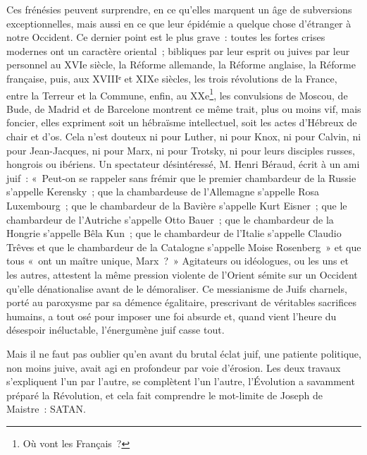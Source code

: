 \documentclass[french,twoside]{book} %
\begin{document}
Ces frénésies peuvent surprendre, en ce qu’elles marquent un âge de subversions exceptionnelles, mais aussi en ce que leur épidémie a quelque chose d’étranger à notre Occident. Ce dernier point est le plus grave : toutes les fortes crises modernes ont un caractère oriental ; bibliques par leur esprit ou juives par leur personnel au XVIe siècle, la Réforme allemande, la Réforme anglaise, la Réforme française, puis, aux XVIIIᵉ et XIXe siècles, les trois révolutions de la France, entre la Terreur et la Commune, enfin, au XXe\footnote{Où vont les Français ?}, les convulsions de Moscou, de Bude, de Madrid et de Barcelone montrent ce même trait, plus ou moins vif, mais foncier, elles expriment soit un hébraïsme intellectuel, soit les actes d’Hébreux de chair et d’os. Cela n’est douteux ni pour Luther, ni pour Knox, ni pour Calvin, ni pour Jean-Jacques, ni pour Marx, ni pour Trotsky, ni pour leurs disciples russes, hongrois ou ibériens. Un spectateur désintéressé, M. Henri Béraud, écrit à un ami juif : « Peut-on se rappeler sans frémir que le premier chambardeur de la Russie s’appelle Kerensky ; que la chambardeuse de l’Allemagne s’appelle Rosa Luxembourg ; que le chambardeur de la Bavière s’appelle Kurt Eisner ; que le chambardeur de l’Autriche s’appelle Otto Bauer ; que le chambardeur de la Hongrie s’appelle Bêla Kun ; que le chambardeur de l’Italie s’appelle Claudio Trêves et que le chambardeur de la Catalogne s’appelle Moise Rosenberg » et que tous « ont un maître unique, Marx ? » Agitateurs ou idéologues, ou les uns et les autres, attestent la même pression violente de l’Orient sémite sur un Occident qu’elle dénationalise avant de le démoraliser. Ce messianisme de Juifs charnels, porté au paroxysme par sa démence égalitaire, prescrivant de véritables sacrifices humains, a tout osé pour imposer une foi absurde et, quand vient l’heure du désespoir inéluctable, l’énergumène juif casse tout.\par
Mais il ne faut pas oublier qu’en avant du brutal éclat juif, une patiente politique, non moins juive, avait agi en profondeur par voie d’érosion. Les deux travaux s’expliquent l’un par l’autre, se complètent l’un l’autre, l’Évolution a savamment préparé la Révolution, et cela fait comprendre le mot-limite de Joseph de Maistre : SATAN.
\end{document}
